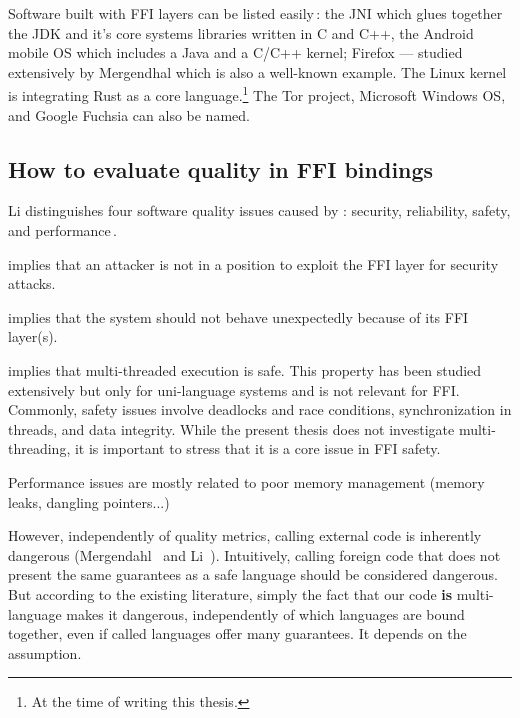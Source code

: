 \documentclass[nomenclature, english, bibtex]{kththesis}
\begin{document}
Software built with FFI layers can be listed easily\,\cite{li_improving_2014,li_detecting_2022,mergendahl_cross-language_2022}: the \gls{JNI} which glues together the \gls{JDK} and it's core systems libraries written in C and C++, the Android mobile \gls{OS} which includes a Java  and a C/C++ kernel; Firefox --- studied extensively by Mergendhal \etal which is also a well-known example. The Linux kernel is integrating Rust as a core language.\footnote{At the time of writing this thesis.} The Tor project, Microsoft Windows \gls{OS}, and Google Fuchsia can also be named.

\subsection{How to evaluate quality in FFI bindings}

Li distinguishes four software quality issues caused by : security, reliability, safety, and performance\,\cite{li_improving_2014}.

\begin{description}[labelwidth=\widthof{\textbf{Memory safety}}, leftmargin = !]
\item[\textbf{Security}] implies that an attacker is not in a position to exploit the FFI layer for security attacks. 
\item[\textbf{Reliability}]implies that the system should not behave unexpectedly because of its FFI layer(s).
\item[\textbf{Safety}] implies that multi-threaded execution is safe. This property has been studied extensively but only for uni-language systems and is not relevant for FFI. Commonly, safety issues involve deadlocks and race conditions, synchronization in threads, and data integrity. While the present thesis does not investigate multi-threading, it is important to stress that it is a core issue in FFI safety.
\item[\textbf{Performance}] Performance issues are mostly related to poor memory management (memory leaks, dangling pointers...)
\end{description}

However, independently of quality metrics, calling external code is inherently dangerous (Mergendahl \etal\,\cite{mergendahl_cross-language_2022} and Li \etal\,\cite{li_detecting_2022}). Intuitively, calling foreign code that does not present the same guarantees as a safe language should be considered dangerous. But according to the existing literature, simply the fact that our code \textbf{is} multi-language makes it dangerous, independently of which languages are bound together, even if called languages offer many guarantees. It depends on the assumption.
\end{document}
